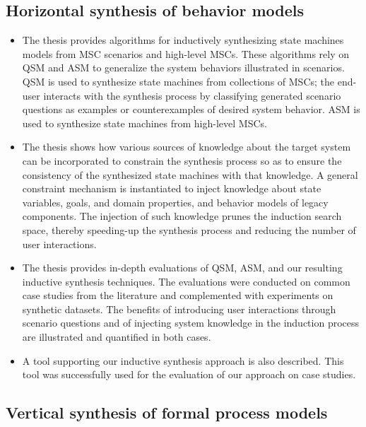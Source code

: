 
\subsection{Horizontal synthesis of behavior models\label{subsection:intro-contrib-inductive-synthesis}}
\begin{itemize}
\item The thesis provides algorithms for inductively synthesizing state machines models from MSC scenarios and high-level MSCs. These algorithms rely on QSM and ASM to generalize the system behaviors illustrated in scenarios. QSM is used to synthesize state machines from collections of MSCs; the end-user interacts with the synthesis process by classifying generated scenario questions as examples or counterexamples of desired system behavior. ASM is used to synthesize state machines from high-level MSCs.
\item The thesis shows how various sources of knowledge about the target system can be incorporated to constrain the synthesis process so as to ensure the consistency of the synthesized state machines with that knowledge. A general constraint mechanism is instantiated to inject knowledge about state variables, goals, and domain properties, and behavior models of legacy components. The injection of such knowledge prunes the induction search space, thereby speeding-up the synthesis process and reducing the number of user interactions.
\item The thesis provides in-depth evaluations of QSM, ASM, and our resulting inductive synthesis techniques. The evaluations were conducted on common case studies from the literature and complemented with experiments on synthetic datasets. The benefits of introducing user interactions through scenario questions and of injecting system knowledge in the induction process are illustrated and quantified in both cases.
\item A tool supporting our inductive synthesis approach is also described. This tool was successfully used for the evaluation of our approach on case studies.
\end{itemize}


\subsection{Vertical synthesis of formal process models\label{subsection:intro-contib-supporting-process-models}}

